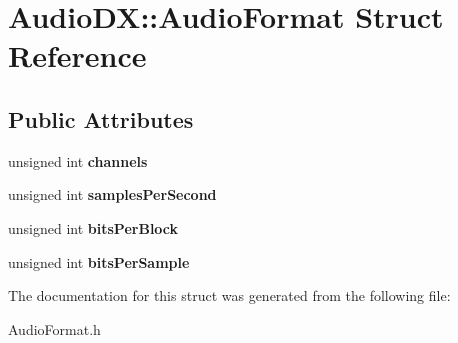 \hypertarget{struct_audio_d_x_1_1_audio_format}{\section{Audio\-D\-X\-:\-:Audio\-Format Struct Reference}
\label{struct_audio_d_x_1_1_audio_format}
}
\subsection*{Public Attributes}
\begin{DoxyCompactItemize}
\item 
\hypertarget{struct_audio_d_x_1_1_audio_format_abb4ac7cdfaee71a384f897fb66dfbf6f}{unsigned int {\bfseries channels}}\label{struct_audio_d_x_1_1_audio_format_abb4ac7cdfaee71a384f897fb66dfbf6f}

\item 
\hypertarget{struct_audio_d_x_1_1_audio_format_abb6d613e6aa6fe3ea89346f928682ac2}{unsigned int {\bfseries samples\-Per\-Second}}\label{struct_audio_d_x_1_1_audio_format_abb6d613e6aa6fe3ea89346f928682ac2}

\item 
\hypertarget{struct_audio_d_x_1_1_audio_format_a1d3af66864e53a267e9b49b1689e7215}{unsigned int {\bfseries bits\-Per\-Block}}\label{struct_audio_d_x_1_1_audio_format_a1d3af66864e53a267e9b49b1689e7215}

\item 
\hypertarget{struct_audio_d_x_1_1_audio_format_a6fb2f886f394562d4b1c8d4f7986f59e}{unsigned int {\bfseries bits\-Per\-Sample}}\label{struct_audio_d_x_1_1_audio_format_a6fb2f886f394562d4b1c8d4f7986f59e}

\end{DoxyCompactItemize}


The documentation for this struct was generated from the following file\-:\begin{DoxyCompactItemize}
\item 
Audio\-Format.\-h\end{DoxyCompactItemize}
